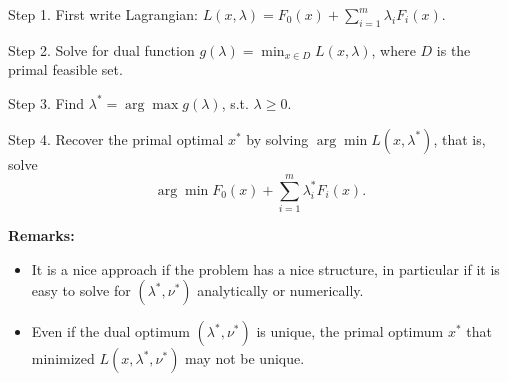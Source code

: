 	Step 1. First write Lagrangian: $L(x, \lambda) = F_0(x) + \sum^m_{i=1}\lambda_iF_i(x)$.
	
	Step 2. Solve for dual function $g(\lambda) = \min_{x\in D} L(x, \lambda)$, where $D$ is the primal feasible set.
	
	Step 3. Find $\lambda^* = \arg\max g(\lambda)$, s.t. $\lambda \geq 0$.
	
	Step 4. Recover the primal optimal $x^*$ by solving $\arg\min L(x, \lambda^*)$, that is, solve
		$$\arg\min F_0(x) + \sum^m_{i=1}\lambda_i^*F_i(x).$$

\noindent\textbf{Remarks:}
\begin{itemize}
	\item It is a nice approach if the problem has a nice structure, in particular if it is easy to solve for $(\lambda^*, \nu^*)$ analytically or numerically. 
	
	\item Even if the dual optimum $(\lambda^*, \nu^*)$ is unique, the primal optimum $x^*$ that minimized $L(x, \lambda^*, \nu^*)$ may not be unique.
\end{itemize}



